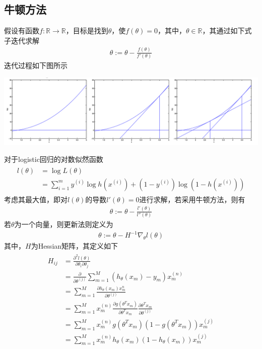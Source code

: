 \subsection{牛顿方法}
假设有函数$f:\mathbb{R}\rightarrow\mathbb{R}$，目标是找到$\theta$，使$f(\theta)=0$，其中，$\theta\in \mathbb{R}$，其通过如下式子迭代求解
\begin{eqnarray}
\theta:=\theta-\frac{f(\theta)}{f'(\theta)}
\end{eqnarray}
迭代过程如下图所示
\begin{center}
\includegraphics[scale=0.3]{../figures/cs229_2_2.png} 
\end{center}
对于logistic回归的对数似然函数
\begin{eqnarray}
\begin{aligned}
l(\theta) &= \log L(\theta)\\
&= \sum_{i=1}^m y^{(i)}\log h(x^{(i)})+(1-y^{(i)})\log (1-h(x^{(i)}))
\end{aligned}
\end{eqnarray}
考虑其最大值，即对$l(\theta)$的导数$l'(\theta)=0$进行求解，若采用牛顿方法，则有
\begin{eqnarray}
\theta:=\theta-\frac{l'(\theta)}{l''(\theta)}
\end{eqnarray}
若$\theta$为一个向量，则更新法则定义为
\begin{eqnarray}
\theta:=\theta-H^{-1}\nabla_\theta l(\theta)
\end{eqnarray}
其中，$H$为Hessian矩阵，其定义如下
\begin{eqnarray}
\begin{aligned}
H_{ij}&=\frac{\partial^2l(\theta)}{\partial\theta_i\partial\theta_j}\\
&= \frac{\partial}{\partial \theta^{(j)}}\sum_{m=1}^M(h_\theta(x_m)-y_m)x_m^{(n)}\\
&= \sum_{m=1}^M\frac{\partial h_\theta(x_m)x_m^{n}}{\partial \theta^{(j)}}\\
&= \sum_{m=1}^Mx_m^{(n)}\frac{\partial g(\theta^Tx_m)}{\partial \theta^Tx_m}\frac{\partial\theta^Tx_m}{\partial\theta^{(j)}}\\
&= \sum_{m=1}^Mx_m^{(n)}g(\theta^Tx_m)(1-g(\theta^Tx_m))x_m^{(j)}\\
&= \sum_{m=1}^Mx_m^{(n)}h_\theta(x_m)(1-h_\theta(x_m))x_m^{(j)}
\end{aligned}
\end{eqnarray}
